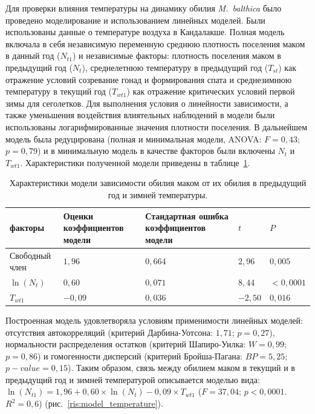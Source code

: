 Для проверки влияния температуры на динамику обилия \textit{M.~balthica} было проведено моделирование и использованием линейных моделей. 
Были использованы данные о температуре воздуха в Кандалакше. 
Полная модель включала в себя независимую переменную среднюю плотность поселения маком в данный год ($N_{t1}$) и независимые факторы: плотность поселения маком в предыдущий год ($N_{t}$), среднелетнюю температуру в предыдущий год ($T_{st}$) как отражение условий созревание гонад и формирования спата и среднезимнюю температуру в текущий год ($T_{wt1}$) как отражение критических условий первой зимы для сеголетков. 
Для выполнения условия о линейности зависимости, а также уменьшения воздействия влиятельных наблюдений в модели были использованы логарифмированные значения плотности поселения. 
В дальнейшем модель была редуцирована (полная и минимальная модели, ANOVA: $F = 0,43$; $p = 0,79$) и в минимальную модель в качестве факторов были включены $N_{t}$ и $T_{wt1}$. 
Характеристики полученной модели приведены в таблице~\ref{tab:model_koeff}. 
	\begin{table}[p]
	\caption{Характеристики модели зависимости обилия маком от их обилия в предыдущий год и зимней температуры.}
	\label{tab:model_koeff}
		\begin{tabularx}{\textwidth}{|X|X|X|X|X|}
			\hline
			факторы & Оценки  коэффициентов модели & Стандартная ошибка коэффициентов модели & $t$ & $P$ \\ \hline
			Свободный член & $1,96$ & $0,664$ & $2,96$ & $0,005$ \\ \hline
			$\ln(N_{t})$ & $0,60$ & $0,071$ & $8,44$ & $<0,0001$ \\ \hline
			$T_{wt1}$ & $-0,09$ & $0,036$ & $-2,50$ & $0,016$ \\ \hline
		\end{tabularx}
	\end{table}
Построенная модель удовлетворяла условиям применимости линейных моделей: отсутствия автокорреляций (критерий Дарбина-Уотсона: $1,71$; $p = 0,27$), нормальности распределения остатков (критерий Шапиро-Уилка: $W = 0,99$; $p = 0,86$) и гомогенности дисперсий (критерий Бройша-Пагана: $BP = 5,25$; $p-value = 0,15$). 
Таким образом, связь между обилием маком в текущий и в предыдущий год и зимней температурой описывается моделью вида: $\ln(N_{t1}) = 1,96 + 0,60 \times \ln(N_{t}) - 0,09 \times T_{wt1}$ ($F = 37,04$; $p < 0,0001$. $R^2 = 0,6$) (рис.~\ref{ris:model_temperature}).
